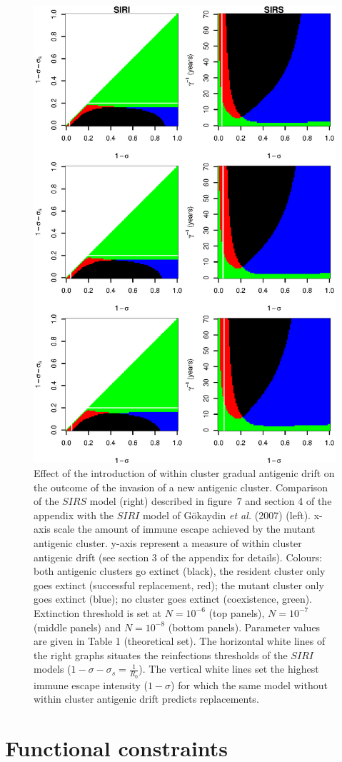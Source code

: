 \begin{figure}[!h]
  \center
  \includegraphics[width=0.5\linewidth]{graphs/article1/within_drift.eps}
  \caption{Effect of the introduction of within cluster
    gradual antigenic drift on the outcome of the invasion of a new
    antigenic cluster. Comparison of the $SIRS$ model (right)
    described in figure~7 and section 4 of the appendix with the
    $SIRI$ model of Gökaydin \textit{et al.} (2007) (left). x-axis
    scale the amount of immune escape achieved by the mutant antigenic
    cluster. y-axis represent a measure of within cluster antigenic
    drift (see section 3 of the appendix for details). Colours: both
    antigenic clusters go extinct (black), the resident cluster only
    goes extinct (successful replacement, red); the mutant cluster
    only goes extinct (blue); no cluster goes extinct (coexistence,
    green). Extinction threshold is set at $N=10^{-6}$ (top panels),
    $N=10^{-7}$ (middle panels) and $N=10^{-8}$ (bottom panels).
    Parameter values are given in Table 1 (theoretical set). The
    horizontal white lines of the right graphs situates the
    reinfections thresholds of the $SIRI$ models
    ($1-\sigma-\sigma_s=\frac{1}{R_0}$). The vertical white lines set
    the highest immune escape intensity ($1-\sigma$) for which the
    same model without within cluster antigenic drift predicts
    replacements.}
\label{fig:within_drift_app}
\end{figure}

\clearpage


\section{Functional constraints}


